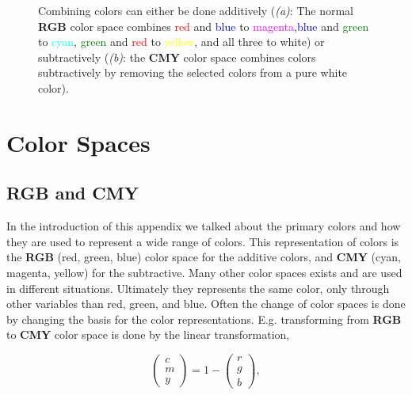 \begin{figure}[H]
    \centering
    \captionsetup[subfigure]{justification=centering}
    \begin{subfigure}[b]{0.49\textwidth}
        \centering
        
		\caption{}
		\label{fig:color_additive}
    \end{subfigure}
    \begin{subfigure}[b]{0.49\textwidth}
        \centering
        
		\caption{}
		\label{fig:color_subtractive}
    \end{subfigure}
    \caption{Combining colors can either be done additively  (\textit{(a)}: The normal \textbf{RGB} color space combines \textcolor{red}{red} and \textcolor{blue}{blue} to \textcolor{magenta}{magenta},\textcolor{blue}{blue} and \textcolor{green}{green} to \textcolor{cyan}{cyan}, \textcolor{green}{green} and \textcolor{red}{red} to \textcolor{yellow}{yellow}, and all three to white) or subtractively (\textit{(b)}: the \textbf{CMY} color space combines colors subtractively by removing the selected colors from a pure white color).}
    \label{fig:color_arithmetic}
\end{figure}

\section{Color Spaces}

\subsection{\textbf{RGB} and \textbf{CMY}}

In the introduction of this appendix we talked about the primary colors and how they are used to represent a wide range of colors. This representation of colors is the \textbf{RGB} (red, green, blue) color space for the additive colors, and \textbf{CMY} (cyan, magenta, yellow) for the subtractive. Many other color spaces exists and are used in different situations. Ultimately they represents the same color, only through other variables than red, green, and blue. Often the change of color spaces is done by changing the basis for the color representations. E.g. transforming from \textbf{RGB} to \textbf{CMY} color space is done by the linear transformation,

\begin{equation}
\left(\begin{array}{c}
c \\ m \\ y
\end{array}\right) = 1- \left(\begin{array}{c}
r \\ g \\ b
\end{array}\right),
\end{equation}

